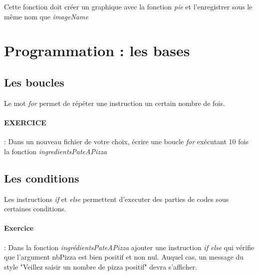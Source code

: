 Cette fonction doit créer un graphique avec la fonction \emph{pie} et l'enregistrer sous le même nom que \emph{imageName}

\section{Programmation : les bases}

\subsection{Les boucles}

Le mot \emph{for} permet de répéter une instruction un certain nombre de fois.

\paragraph{EXERCICE} : Dans un nouveau fichier de votre choix, écrire une boucle \emph{for} exécutant 10 fois  la fonction \emph{ingredientsPateAPizza}

\subsection{Les conditions}
Les instructions \emph{if} et \emph{else} permettent d'executer des parties de codes sous certaines conditions.

\paragraph{Exercice} : Dans la fonction \emph{ingrédientsPateAPizza} ajouter une instruction \emph{if else} qui vérifie que l'argument nbPizza est bien positif et non nul. Auquel cas, un message du style "Veillez saisir un nombre de pizza positif" devra s'afficher.
 











